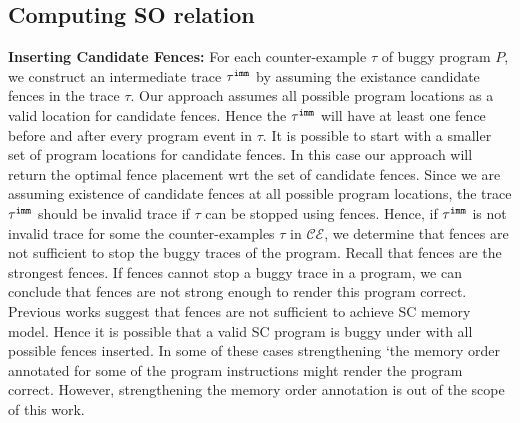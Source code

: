 

\subsection{Computing SO relation}
\noindent\textbf{Inserting Candidate Fences:}
For each counter-example $ \tau $ of buggy program $ P $, we 
construct an intermediate trace $ {\tau}^{\mathtt{imm}} $ by assuming the existance candidate fences in the trace $ \tau $.
Our approach assumes all possible program locations as a valid location 
for candidate fences. 
Hence the $ {\tau}^{\mathtt{imm}} $ will have at least one \mosc fence before and after every program event in $ \tau $.
It is possible to start with a smaller set of program locations for 
candidate fences. 
In this case our approach will return the optimal fence placement wrt the 
set of candidate fences.
Since we are assuming existence of candidate fences at all possible 
program locations, the trace $ {\tau}^{\mathtt{imm}} $ should be invalid \cc trace 
if $ \tau $ can be stopped using \mosc fences.
Hence, if $ {\tau}^{\mathtt{imm}} $ is not invalid \cc trace for some 
the counter-examples $ \tau $ in $ \mathcal{CE} $, we determine that \mosc 
fences are not sufficient to stop the buggy traces of the program.
Recall that \mosc fences are the strongest \cc fences. 
If \mosc fences cannot stop a buggy trace in a program, we can conclude 
that \cc fences are not strong enough to render this program correct.
Previous works \cite{LahavVafeiadis-PLDI17,Batty-POPL12} suggest that \mosc fences are not sufficient to achieve SC memory 
model. 
Hence it is possible that a valid SC program is buggy under \cc with all 
possible \mosc fences inserted. 
In some of these cases strengthening `the memory order annotated for some 
of the program instructions might render the program correct. 
However, strengthening the memory order annotation is out of the scope of this work. 

